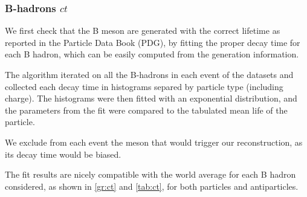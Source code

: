 \subsubsection{B-hadrons $ct$}
\label{subsubsec:mc_ct}

We first check that the B meson are generated with the correct lifetime as reported in the Particle Data Book (PDG), by fitting the proper decay time for each B hadron, which can be easily computed from the generation information.

The algorithm iterated on all the B-hadrons in each event of the datasets and collected each decay time in histograms separed by particle type (including charge).
The histograms were then fitted with an exponential distribution, and the parameters from the fit were compared to the tabulated mean life of the particle.

We exclude from each event the meson that would trigger our reconstruction, as its decay time would be biased.

The fit results are nicely compatible with the world average for each B hadron considered, as shown in \autoref{gr:ct} and \autoref{tab:ct}, for both particles and antiparticles.

